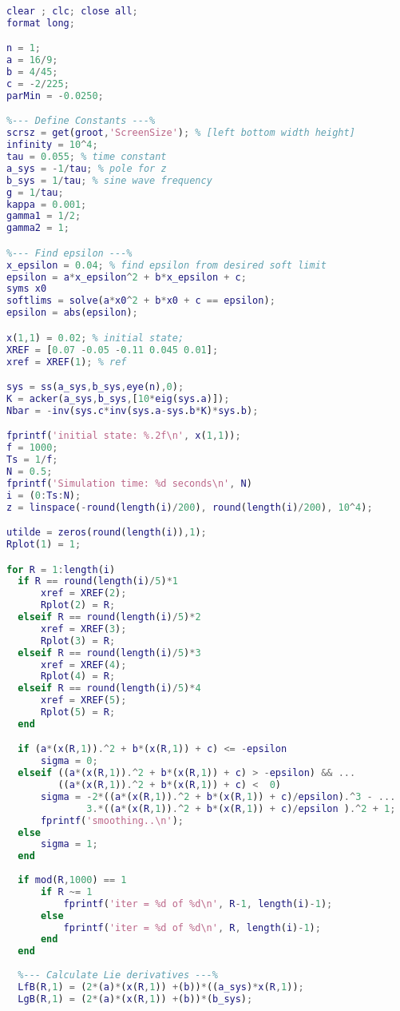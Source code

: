 \begin{lstlisting}[language=matlab]
clear ; clc; close all;
format long;

n = 1;
a = 16/9;
b = 4/45;
c = -2/225; 
parMin = -0.0250;

%--- Define Constants ---%
scrsz = get(groot,'ScreenSize'); % [left bottom width height]
infinity = 10^4;   
tau = 0.055; % time constant
a_sys = -1/tau; % pole for z
b_sys = 1/tau; % sine wave frequency
g = 1/tau;
kappa = 0.001;
gamma1 = 1/2;
gamma2 = 1;

%--- Find epsilon ---%
x_epsilon = 0.04; % find epsilon from desired soft limit
epsilon = a*x_epsilon^2 + b*x_epsilon + c;
syms x0
softlims = solve(a*x0^2 + b*x0 + c == epsilon);
epsilon = abs(epsilon);

x(1,1) = 0.02; % initial state;
XREF = [0.07 -0.05 -0.11 0.045 0.01];
xref = XREF(1); % ref

sys = ss(a_sys,b_sys,eye(n),0);
K = acker(a_sys,b_sys,[10*eig(sys.a)]);
Nbar = -inv(sys.c*inv(sys.a-sys.b*K)*sys.b);

fprintf('initial state: %.2f\n', x(1,1));
f = 1000; 
Ts = 1/f;
N = 0.5;
fprintf('Simulation time: %d seconds\n', N)
i = (0:Ts:N);
z = linspace(-round(length(i)/200), round(length(i)/200), 10^4);

utilde = zeros(round(length(i)),1);
Rplot(1) = 1;

for R = 1:length(i)
  if R == round(length(i)/5)*1
      xref = XREF(2);
      Rplot(2) = R;
  elseif R == round(length(i)/5)*2
      xref = XREF(3);
      Rplot(3) = R;
  elseif R == round(length(i)/5)*3
      xref = XREF(4);
      Rplot(4) = R;
  elseif R == round(length(i)/5)*4
      xref = XREF(5);
      Rplot(5) = R;
  end

  if (a*(x(R,1)).^2 + b*(x(R,1)) + c) <= -epsilon
      sigma = 0;
  elseif ((a*(x(R,1)).^2 + b*(x(R,1)) + c) > -epsilon) && ...
         ((a*(x(R,1)).^2 + b*(x(R,1)) + c) <  0)
      sigma = -2*((a*(x(R,1)).^2 + b*(x(R,1)) + c)/epsilon).^3 - ...
              3.*((a*(x(R,1)).^2 + b*(x(R,1)) + c)/epsilon ).^2 + 1;
      fprintf('smoothing..\n');
  else
      sigma = 1;
  end
  
  if mod(R,1000) == 1
      if R ~= 1
          fprintf('iter = %d of %d\n', R-1, length(i)-1);
      else
          fprintf('iter = %d of %d\n', R, length(i)-1);
      end
  end
  
  %--- Calculate Lie derivatives ---%
  LfB(R,1) = (2*(a)*(x(R,1)) +(b))*((a_sys)*x(R,1));
  LgB(R,1) = (2*(a)*(x(R,1)) +(b))*(b_sys);
  

\end{lstlisting}
